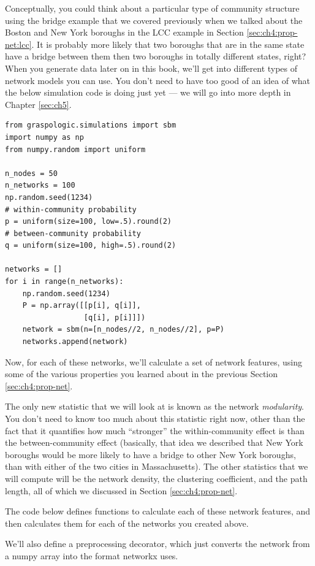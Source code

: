 Conceptually, you could think about a particular type of community structure using the bridge example that we covered previously when we talked about the Boston and New York boroughs in the LCC example in Section \ref{sec:ch4:prop-net:lcc}. It is probably more likely that two boroughs that are in the same state have a bridge between them then two boroughs in totally different states, right? When you generate data later on in this book, we'll get into different types of network models you can use. You don't need to have too good of an idea of what the below simulation code is doing just yet --- we will go into more depth in Chapter \ref{sec:ch5}.

\begin{lstlisting}[style=python]
from graspologic.simulations import sbm
import numpy as np
from numpy.random import uniform

n_nodes = 50
n_networks = 100
np.random.seed(1234)
# within-community probability
p = uniform(size=100, low=.5).round(2)
# between-community probability
q = uniform(size=100, high=.5).round(2)

networks = []
for i in range(n_networks):
    np.random.seed(1234)
    P = np.array([[p[i], q[i]],
                  [q[i], p[i]]])
    network = sbm(n=[n_nodes//2, n_nodes//2], p=P)
    networks.append(network)
\end{lstlisting}
Now, for each of these networks, we'll calculate a set of network features, using some of the various properties you learned about in the previous Section \ref{sec:ch4:prop-net}.

The only new statistic that we will look at is known as the network \textit{modularity}. You don't need to know too much about this statistic right now, other than the fact that it quantifies how much ``stronger'' the within-community effect is than the between-community effect (basically, that idea we described that New York boroughs would be more likely to have a bridge to other New York boroughs, than with either of the two cities in Massachusetts). The other statistics that we will compute will be the network density, the clustering coefficient, and the path length, all of which we discussed in Section \ref{sec:ch4:prop-net}.

The code below defines functions to calculate each of these network features, and then calculates them for each of the networks you created above.

We'll also define a preprocessing decorator, which just converts the network from a numpy array into the format networkx uses.


